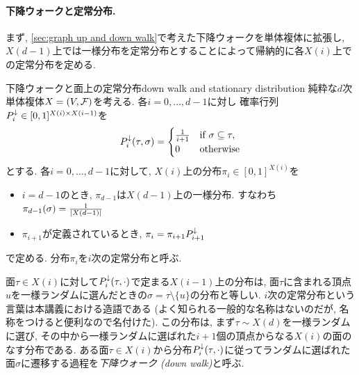 \paragraph*{下降ウォークと定常分布.}
まず, \cref{sec:graph up and down walk}で考えた下降ウォークを単体複体に拡張し, $X(d-1)$上では一様分布を定常分布とすることによって帰納的に各$X(i)$上での定常分布を定める.
\begin{definition}{下降ウォークと面上の定常分布}{down walk and stationary distribution}
    純粋な$d$次単体複体$X=(V,\mathcal{F})$を考える.
    各$i=0,\dots,d-1$に対し
        確率行列$P^{\downarrow}_i \in [0,1]^{X(i) \times X(i-1)}$を
        \[
            P^{\downarrow}_i(\tau,\sigma) = \begin{cases}
                \frac{1}{i+1}	& \text{if } \sigma \subseteq \tau,\\
                0 & \text{otherwise}
            \end{cases}
        \]
        とする.
    各$i=0,\dots,d-1$に対して, $X(i)$上の分布$\pi_i \in [0,1]^{X(i)}$を
        \begin{itemize}
        \item $i=d-1$のとき, $\pi_{d-1}$は$X(d-1)$上の一様分布. すなわち$\pi_{d-1}(\sigma) = \frac{1}{\lvert X(d-1)\rvert}$
        \item $\pi_{i+1}$が定義されているとき, $\pi_i = \pi_{i+1}P^{\downarrow}_{i+1}$
        \end{itemize}
    で定める.
    分布$\pi_i$を$i$次の定常分布と呼ぶ.
\end{definition}
面$\tau \in X(i)$に対して$P^{\downarrow}_i(\tau,\cdot)$で定まる$X(i-1)$上の分布は, 面$\tau$に含まれる頂点$u$を一様ランダムに選んだときの$\sigma = \tau \setminus\{u\}$の分布と等しい.
$i$次の定常分布という言葉は本講義における造語である (よく知られる一般的な名称はないのだが, 名称をつけると便利なので名付けた).
この分布は, まず$\tau \sim X(d)$を一様ランダムに選び, その中から一様ランダムに選ばれた$i+1$個の頂点からなる$X(i)$の面のなす分布である.
ある面$\tau\in X(i)$から分布$P^{\downarrow}_i(\tau,\cdot)$に従ってランダムに選ばれた面$\sigma$に遷移する過程を\emph{下降ウォーク (down walk)}と呼ぶ.

